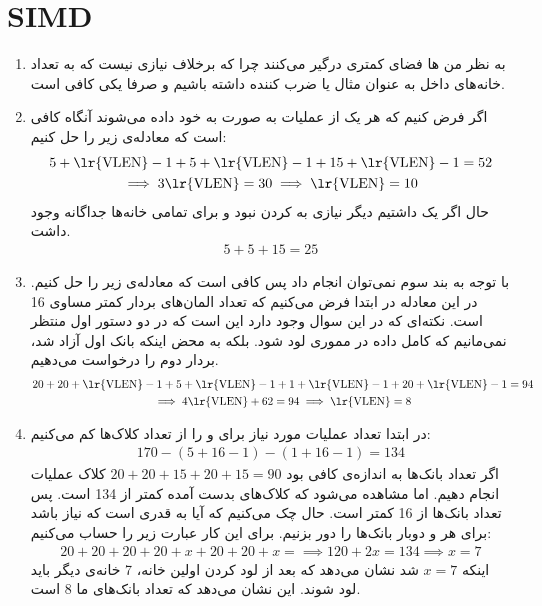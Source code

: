 \section{SIMD}
\begin{enumerate}
    \item به نظر من ها فضای کمتری درگیر می‌کنند
    چرا که برخلاف  نیازی نیست که
    به تعداد خانه‌های داخل
    به عنوان مثال
     یا ضرب کننده
    داشته باشیم و صرفا یکی کافی است.
    \item اگر فرض کنیم که هر یک از عملیات به صورت
    به خود
    داده می‌شوند آنگاه کافی است که معادله‌ی زیر را حل کنیم:
    \begin{gather*}
        5 + \text{\lr{VLEN}} - 1 + 5 + \text{\lr{VLEN}} - 1 + 15 + \text{\lr{VLEN}} - 1 = 52\\
        \implies 3 \text{\lr{VLEN}} = 30 \implies \text{\lr{VLEN}} = 10
    \end{gather*}
    حال اگر یک
    داشتیم دیگر نیازی به
    کردن نبود و برای تمامی خانه‌ها
    جداگانه وجود داشت.
    \begin{gather*}
        5 + 5 + 15 = 25
    \end{gather*}
    \item با توجه به بند سوم نمی‌توان  انجام داد پس کافی است که معادله‌ی زیر را حل کنیم.
    در این معادله در ابتدا فرض می‌کنیم که تعداد المان‌های بردار کمتر مساوی 16 است. نکته‌ای که در این سوال وجود
    دارد این است که در دو دستور
    اول منتظر نمی‌مانیم که کامل داده در مموری لود شود. بلکه به محض اینکه بانک اول آزاد شد، بردار دوم را
    درخواست می‌دهیم.
    \begin{gather*}
        20 + 20 + \text{\lr{VLEN}} - 1 + 5 + \text{\lr{VLEN}} - 1 + 1 + \text{\lr{VLEN}} - 1 + 20 + \text{\lr{VLEN}} - 1 = 94\\
        \implies 4 \text{\lr{VLEN}} + 62 = 94 \implies \text{\lr{VLEN}} = 8
    \end{gather*}
    \item در ابتدا تعداد عملیات مورد نیاز برای
     و 
    را از تعداد کلاک‌ها کم می‌کنیم:
    \begin{gather*}
        170 - (5 + 16 - 1) - (1 + 16 - 1) = 134
    \end{gather*}
    اگر تعداد بانک‌ها به اندازه‌ی کافی بود
    $20 + 20 + 15 + 20 + 15 = 90$
    کلاک عملیات انجام دهیم. اما مشاهده می‌شود که کلاک‌های بدست آمده کمتر از 134 است. پس تعداد بانک‌ها از 16 کمتر است.
    حال چک می‌کنیم که آیا به قدری است که نیاز باشد برای هر
     و 
    دوبار بانک‌ها را دور بزنیم. برای این کار عبارت زیر را حساب می‌کنیم:
    \begin{gather*}
        20 + 20 + 20 + 20 + x + 20 + 20 + x = \implies 120 + 2x = 134 \implies x = 7
    \end{gather*}
    اینکه
    $x = 7$
    شد نشان می‌دهد که بعد از لود کردن اولین خانه، 7 خانه‌ی دیگر باید لود شوند. این نشان می‌دهد که تعداد بانک‌های
    ما 8 است.
\end{enumerate}